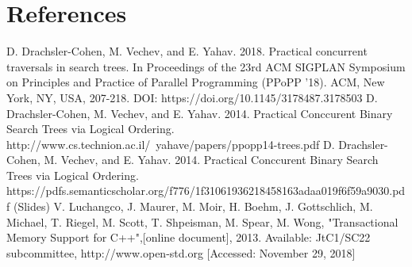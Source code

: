 \documentclass[conference]{IEEEtran}
\begin{document}
\section*{References}




\begin{thebibliography}{00}
 D. Drachsler-Cohen, M. Vechev, and E. Yahav. 2018. Practical concurrent traversals in search trees. In Proceedings of the 23rd ACM SIGPLAN Symposium on Principles and Practice of Parallel Programming (PPoPP '18). ACM, New York, NY, USA, 207-218. DOI: https://doi.org/10.1145/3178487.3178503
 D. Drachsler-Cohen, M. Vechev, and E. Yahav. 2014. Practical Conccurent Binary Search Trees via Logical Ordering. http://www.cs.technion.ac.il/~yahave/papers/ppopp14-trees.pdf
 D. Drachsler-Cohen, M. Vechev, and E. Yahav. 2014. Practical Conccurent Binary Search Trees via Logical Ordering. https://pdfs.semanticscholar.org/f776/1f31061936218458163adaa019f6f59a9030.pdf (Slides)
 V. Luchangco, J. Maurer, M. Moir, H. Boehm, J. Gottschlich, M. Michael, T. Riegel, M. Scott, T. Shpeisman, M. Spear, M. Wong, "Transactional Memory Support for C++",[online document], 2013. Available: JtC1/SC22 subcommittee, http://www.open-std.org [Accessed: November 29, 2018]

\end{thebibliography}
\end{document}
